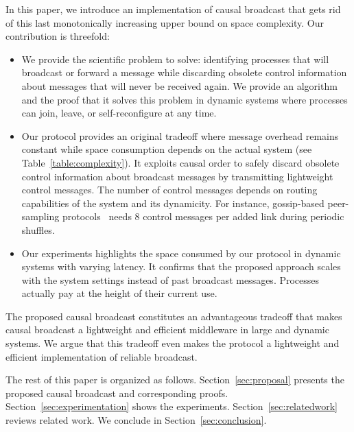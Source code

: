 In this paper, we introduce an implementation of causal broadcast that gets rid
of this last monotonically increasing upper bound on space complexity.  Our
contribution is threefold:
\begin{itemize}[leftmargin=*]
\item We provide the scientific problem to solve: identifying processes that
  will broadcast or forward a message while discarding obsolete control
  information about messages that will never be received again. We provide an
  algorithm and the proof that it solves this problem in dynamic systems where
  processes can join, leave, or self-reconfigure at any time.
\item Our protocol provides an original tradeoff where message overhead remains
  constant while space consumption depends on the actual system (see
  Table~\ref{table:complexity}). It exploits causal order to safely discard
  obsolete control information about broadcast messages by transmitting
  lightweight control messages. The number of control messages depends on
  routing capabilities of the system and its dynamicity. For instance,
  gossip-based peer-sampling
  protocols~\cite{jelasity2007gossip,jelasity2009tman,nedelec2017adaptive} needs
  8 control messages per added link during periodic shuffles.
\item Our experiments highlights the space consumed by our protocol in dynamic
  systems with varying latency. It confirms that the proposed approach scales
  with the system settings instead of past broadcast messages. Processes
  actually pay at the height of their current use.
\end{itemize}
The proposed causal broadcast constitutes an advantageous tradeoff that makes
causal broadcast a lightweight and efficient middleware in large and dynamic
systems. We argue that this tradeoff even makes the protocol a lightweight and
efficient implementation of reliable broadcast.

The rest of this paper is organized as follows. 
Section~\ref{sec:proposal} presents the proposed causal broadcast and
corresponding proofs. Section~\ref{sec:experimentation} shows the
experiments. Section~\ref{sec:relatedwork} reviews related work. We conclude in
Section~\ref{sec:conclusion}.


